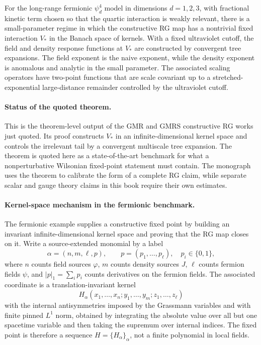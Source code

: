 \begin{quotedtheorem}
\label{qthm:long-range-fermionic-psi4-fixed-point}
For the long-range fermionic \(\psi^4_d\) model in dimensions
\(d=1,2,3\), with fractional kinetic term chosen so that the quartic
interaction is weakly relevant, there is a small-parameter regime in which
the constructive RG map has a nontrivial fixed interaction \(V_\ast\) in the
Banach space of kernels.  With a fixed ultraviolet cutoff, the field and
density response functions at \(V_\ast\) are constructed by convergent tree
expansions.  The field exponent is the naive exponent, while the density
exponent is anomalous and analytic in the small parameter.  The associated
scaling operators have two-point functions that are scale covariant up to a
stretched-exponential large-distance remainder controlled by the ultraviolet
cutoff.
\end{quotedtheorem}

\paragraph{Status of the quoted theorem.}
This is the theorem-level output of the GMR and GMRS constructive RG works
just quoted.  Its proof constructs \(V_\ast\) in an infinite-dimensional
kernel space and controls the irrelevant tail by a convergent multiscale tree
expansion.  The theorem is quoted here as a state-of-the-art benchmark for
what a nonperturbative Wilsonian fixed-point statement must contain.  The
monograph uses the theorem to calibrate the form of a complete RG claim, while
separate scalar and gauge theory claims in this book require their own
estimates.

\paragraph{Kernel-space mechanism in the fermionic benchmark.}
The fermionic example supplies a constructive fixed point by building an
invariant infinite-dimensional kernel space and proving that the RG map closes
on it.  Write a source-extended monomial by a label
\[
  \alpha=(n,m,\ell,p),
  \qquad
  p=(p_1,\ldots,p_\ell),\quad p_i\in\{0,1\},
\]
where \(n\) counts field sources \(\varphi\), \(m\) counts density sources
\(J\), \(\ell\) counts fermion fields \(\psi\), and
\(|p|_1=\sum_i p_i\) counts derivatives on the fermion fields.  The associated
coordinate is a translation-invariant kernel
\[
  H_\alpha(x_1,\ldots,x_n;y_1,\ldots,y_m;z_1,\ldots,z_\ell)
\]
with the internal antisymmetries imposed by the Grassmann variables and with
finite pinned \(L^1\) norm, obtained by integrating the absolute value over all
but one spacetime variable and then taking the supremum over internal indices.
The fixed point is therefore a sequence \(H=\{H_\alpha\}_\alpha\), not a finite
polynomial in local fields.

